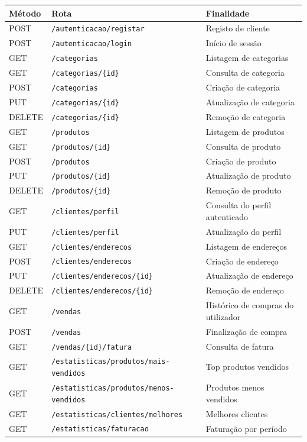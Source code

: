 \documentclass[10pt,a4paper]{report}
\begin{document}
\begin{longtable}{|>{\raggedright\arraybackslash}p{2.2cm}|>{\raggedright\arraybackslash}p{6cm}|>{\raggedright\arraybackslash}p{5.2cm}|}
\hline
\textbf{Método} & \textbf{Rota} & \textbf{Finalidade} \\
\hline
\endhead
POST & \texttt{/autenticacao/registar} & Registo de cliente \\
\hline
POST & \texttt{/autenticacao/login} & Início de sessão \\
\hline
GET & \texttt{/categorias} & Listagem de categorias \\
\hline
GET & \texttt{/categorias/\{id\}} & Consulta de categoria \\
\hline
POST & \texttt{/categorias} & Criação de categoria \\
\hline
PUT & \texttt{/categorias/\{id\}} & Atualização de categoria \\
\hline
DELETE & \texttt{/categorias/\{id\}} & Remoção de categoria \\
\hline
GET & \texttt{/produtos} & Listagem de produtos \\
\hline
GET & \texttt{/produtos/\{id\}} & Consulta de produto \\
\hline
POST & \texttt{/produtos} & Criação de produto \\
\hline
PUT & \texttt{/produtos/\{id\}} & Atualização de produto \\
\hline
DELETE & \texttt{/produtos/\{id\}} & Remoção de produto \\
\hline
GET & \texttt{/clientes/perfil} & Consulta do perfil autenticado \\
\hline
PUT & \texttt{/clientes/perfil} & Atualização do perfil \\
\hline
GET & \texttt{/clientes/enderecos} & Listagem de endereços \\
\hline
POST & \texttt{/clientes/enderecos} & Criação de endereço \\
\hline
PUT & \texttt{/clientes/enderecos/\{id\}} & Atualização de endereço \\
\hline
DELETE & \texttt{/clientes/enderecos/\{id\}} & Remoção de endereço \\
\hline
GET & \texttt{/vendas} & Histórico de compras do utilizador \\
\hline
POST & \texttt{/vendas} & Finalização de compra \\
\hline
GET & \texttt{/vendas/\{id\}/fatura} & Consulta de fatura \\
\hline
GET & \texttt{/estatisticas/produtos/mais-vendidos} & Top produtos vendidos \\
\hline
GET & \texttt{/estatisticas/produtos/menos-vendidos} & Produtos menos vendidos \\
\hline
GET & \texttt{/estatisticas/clientes/melhores} & Melhores clientes \\
\hline
GET & \texttt{/estatisticas/faturacao} & Faturação por período \\
\hline
\end{longtable}
\end{document}
